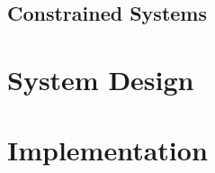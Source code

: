 \documentclass[sigconf,authordraft]{acmart}
\begin{document}
\subsection{Constrained Systems}

\section{System Design}
\label{sec:design}

\section{Implementation}
\label{sec:implementation}





\end{document}
